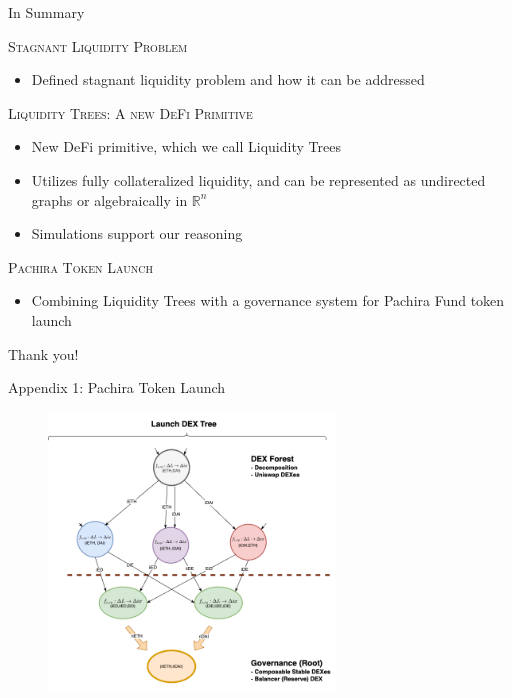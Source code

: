 \documentclass[10pt,xcolor=svgnames]{beamer} %
\begin{document}
\begin{frame}{In Summary}


\begin{exampleblock}{\textsc{Stagnant Liquidity Problem}}
\begin{itemize}
  \item Defined stagnant liquidity problem and how it can be addressed
\end{itemize}
\end{exampleblock}

\begin{exampleblock}{\textsc{Liquidity Trees: A new DeFi Primitive}}
\begin{itemize}
  \item New DeFi primitive, which we call Liquidity Trees 
  \item Utilizes fully collateralized liquidity, and can be represented as undirected graphs or algebraically in $\mathbb{R}^n$
  \item Simulations support our reasoning
\end{itemize}
\end{exampleblock}

\begin{exampleblock}{\textsc{Pachira Token Launch}}
\begin{itemize}
  \item Combining Liquidity Trees with a governance system for Pachira Fund token launch
\end{itemize}
\end{exampleblock}



\end{frame}


\begin{frame}[standout]
  Thank you! 
\end{frame}

\begin{frame}{Appendix 1: Pachira Token Launch}
\begin{figure}[h!]
\includegraphics[width=3in]{img/dex_forest_single_tree.png}
\label{fig:dex_forest}
\end{figure}
\end{frame}
\end{document}
